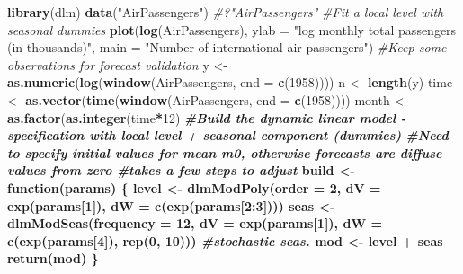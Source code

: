 \documentclass[]{book}
\newenvironment{Shaded}{\begin{snugshade}}{\end{snugshade}}
\newcommand{\KeywordTok}[1]{\textcolor[rgb]{0.13,0.29,0.53}{\textbf{#1}}}
\newcommand{\DataTypeTok}[1]{\textcolor[rgb]{0.13,0.29,0.53}{#1}}
\newcommand{\DecValTok}[1]{\textcolor[rgb]{0.00,0.00,0.81}{#1}}
\newcommand{\StringTok}[1]{\textcolor[rgb]{0.31,0.60,0.02}{#1}}
\newcommand{\CommentTok}[1]{\textcolor[rgb]{0.56,0.35,0.01}{\textit{#1}}}
\newcommand{\ControlFlowTok}[1]{\textcolor[rgb]{0.13,0.29,0.53}{\textbf{#1}}}
\newcommand{\OperatorTok}[1]{\textcolor[rgb]{0.81,0.36,0.00}{\textbf{#1}}}
\newcommand{\NormalTok}[1]{#1}
\begin{document}
\begin{Shaded}
\begin{Highlighting}[]
\KeywordTok{library}\NormalTok{(dlm)}
\KeywordTok{data}\NormalTok{(}\StringTok{"AirPassengers"}\NormalTok{)}
\CommentTok{#?"AirPassengers"}
\CommentTok{#Fit a local level with seasonal dummies}
\KeywordTok{plot}\NormalTok{(}\KeywordTok{log}\NormalTok{(AirPassengers), }\DataTypeTok{ylab =} \StringTok{"log monthly total passengers (in thousands)"}\NormalTok{, }
     \DataTypeTok{main =} \StringTok{"Number of international air passengers"}\NormalTok{)}
\CommentTok{#Keep some observations for forecast validation}
\NormalTok{y <-}\StringTok{ }\KeywordTok{as.numeric}\NormalTok{(}\KeywordTok{log}\NormalTok{(}\KeywordTok{window}\NormalTok{(AirPassengers, }\DataTypeTok{end =} \KeywordTok{c}\NormalTok{(}\DecValTok{1958}\NormalTok{))))}
\NormalTok{n <-}\StringTok{ }\KeywordTok{length}\NormalTok{(y)}
\NormalTok{time <-}\StringTok{ }\KeywordTok{as.vector}\NormalTok{(}\KeywordTok{time}\NormalTok{(}\KeywordTok{window}\NormalTok{(AirPassengers, }\DataTypeTok{end =} \KeywordTok{c}\NormalTok{(}\DecValTok{1958}\NormalTok{))))}
\NormalTok{month <-}\StringTok{ }\KeywordTok{as.factor}\NormalTok{(}\KeywordTok{as.integer}\NormalTok{(time}\OperatorTok{*}\DecValTok{12}\NormalTok{) }\OperatorTok{%%}\DecValTok{12}\NormalTok{)}
\CommentTok{#Build the dynamic linear model  - specification with local level + seasonal component (dummies)}
\CommentTok{#Need to specify initial values for mean m0, otherwise forecasts are diffuse values from zero}
\CommentTok{#takes a few steps to adjust}
\NormalTok{build <-}\StringTok{ }\ControlFlowTok{function}\NormalTok{(params) \{}
\NormalTok{  level <-}\StringTok{ }\KeywordTok{dlmModPoly}\NormalTok{(}\DataTypeTok{order =} \DecValTok{2}\NormalTok{, }\DataTypeTok{dV =} \KeywordTok{exp}\NormalTok{(params[}\DecValTok{1}\NormalTok{]), }\DataTypeTok{dW =} \KeywordTok{c}\NormalTok{(}\KeywordTok{exp}\NormalTok{(params[}\DecValTok{2}\OperatorTok{:}\DecValTok{3}\NormalTok{])))}
\NormalTok{  seas <-}\StringTok{ }\KeywordTok{dlmModSeas}\NormalTok{(}\DataTypeTok{frequency =} \DecValTok{12}\NormalTok{, }\DataTypeTok{dV =} \KeywordTok{exp}\NormalTok{(params[}\DecValTok{1}\NormalTok{]), }\DataTypeTok{dW =} \KeywordTok{c}\NormalTok{(}\KeywordTok{exp}\NormalTok{(params[}\DecValTok{4}\NormalTok{]), }\KeywordTok{rep}\NormalTok{(}\DecValTok{0}\NormalTok{, }\DecValTok{10}\NormalTok{)))  }\CommentTok{#stochastic seas.}
\NormalTok{  mod <-}\StringTok{ }\NormalTok{level }\OperatorTok{+}\StringTok{ }\NormalTok{seas }
  \KeywordTok{return}\NormalTok{(mod)}
\NormalTok{\}}
}
\end{Highlighting}
\end{Shaded}
\end{document}
